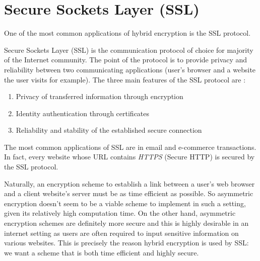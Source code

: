 \section{Secure Sockets Layer (SSL)}

\label{sec:ssl} 

One of the most common applications of hybrid encryption is the SSL protocol.

Secure Sockets Layer (SSL) is the communication protocol of choice for majority of the Internet community. 
The point of the protocol is to provide privacy and reliability between two communicating applications (user's browser and a website the user visits for example). 
The three main features of the SSL protocol are \cite{mckinley}:

\begin{enumerate}
    \item Privacy of transferred information through encryption
    \item Identity authentication through certificates
    \item Reliability and stability of the established secure connection
\end{enumerate}

The most common applications of SSL are in email and e-commerce transactions. 
In fact, every website whose URL contains \emph{HTTPS} (Secure HTTP) is secured by the SSL protocol.

Naturally, an encryption scheme to establish a link between a user's web browser and a client website's server must be as time efficient as possible. 
So asymmetric encryption doesn't seem to be a viable scheme to implement in such a setting, given its relatively high computation time. 
On the other hand, asymmetric encryption schemes are definitely more secure and this is highly desirable in an internet setting as users are often required to input sensitive information on various websites. 
This is precisely the reason hybrid encryption is used by SSL: we want a scheme that is both time efficient and highly secure.

